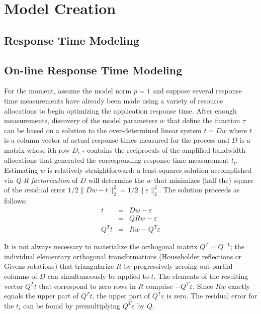 \section{Model Creation}


\subsection*{Response Time Modeling}

\subsection*{On-line Response Time Modeling}

For the moment, assume the model norm $p = 1$ and suppose several response time measurements have already been made using a variety of resource allocations to begin optimizing the application response time.  After enough measurements, discovery of the model parameters $w$ that define the function $\tau$ can be based on a solution to the over-determined linear system
$t=Dw$
where $t$ is a column vector of actual response times measured for the process
and $D$ is a matrix whose ith row $D_{i,*}$ contains the reciprocals of the amplified bandwidth allocations
that generated the corresponding response time measurement $t_i$.
Estimating $w$ is relatively straightforward: a least-squares solution accomplished via
\emph{Q-R factorization}\cite{GoVL} of $D$ will determine the $w$ that minimizes (half the)
square of the \emph residual error $1/2 \|Dw - t\|^2_2 = 1/2 \|\varepsilon\|^2_2$.
The solution proceeds as follows:
\begin{eqnarray*}
t     &=& Dw  - \varepsilon    \\
      &=& QRw - \varepsilon    \\
Q^Tt  &=& Rw  - Q^T\varepsilon
\end{eqnarray*}

It is not always necessary to materialize the orthogonal matrix $Q^T = Q^{-1}$;
the individual elementary orthogonal transformations (Householder reflections or Givens rotations)
that triangularize $R$ by progressively zeroing out partial columns of $D$ can simultaneously be applied to $t$.
The elements of the resulting vector $Q^Tt$ that correspond to zero rows in $R$ comprise $-Q^T\varepsilon$.
Since $Rw$ exactly equals the upper part of $Q^Tt$, the upper part of $Q^T\varepsilon$ is zero. The residual error for the $t_i$
can be found by premultiplying $Q^T\varepsilon$ by $Q$.

